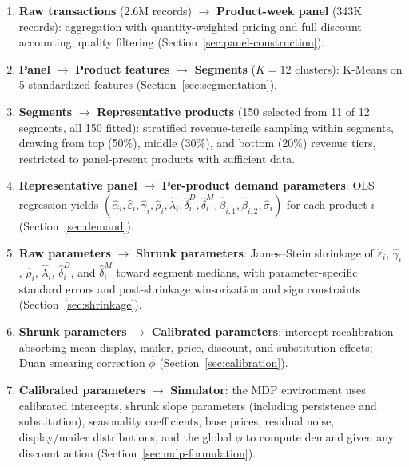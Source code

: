 \documentclass[12pt,a4paper]{article}
\begin{document}
\begin{enumerate}
\item \textbf{Raw transactions} (2.6M records) $\to$
\textbf{Product-week panel} (343K records): aggregation with
quantity-weighted pricing and full discount accounting,
quality filtering (Section~\ref{sec:panel-construction}).

\item \textbf{Panel} $\to$ \textbf{Product features} $\to$
\textbf{Segments} ($K=12$ clusters): K-Means on 5 standardized
features (Section~\ref{sec:segmentation}).

\item \textbf{Segments} $\to$ \textbf{Representative products}
(150 selected from 11 of 12 segments, all 150 fitted):
stratified revenue-tercile sampling within segments, drawing from
top (50\%), middle (30\%), and bottom (20\%) revenue tiers,
restricted to panel-present products with sufficient data.

\item \textbf{Representative panel} $\to$ \textbf{Per-product
demand parameters}: OLS regression yields
$(\hat{\alpha}_i, \hat{\varepsilon}_i, \hat{\gamma}_i,
\hat{\rho}_i, \hat{\lambda}_i,
\hat{\delta}_i^D, \hat{\delta}_i^M,
\hat{\beta}_{i,1}, \hat{\beta}_{i,2},
\hat{\sigma}_i)$ for each
product $i$ (Section~\ref{sec:demand}).

\item \textbf{Raw parameters} $\to$ \textbf{Shrunk parameters}:
James--Stein shrinkage of $\hat{\varepsilon}_i$, $\hat{\gamma}_i$,
$\hat{\rho}_i$, $\hat{\lambda}_i$,
$\hat{\delta}_i^D$, and $\hat{\delta}_i^M$
toward segment medians, with parameter-specific standard errors
and post-shrinkage winsorization and sign constraints
(Section~\ref{sec:shrinkage}).

\item \textbf{Shrunk parameters} $\to$ \textbf{Calibrated parameters}:
intercept recalibration absorbing mean display, mailer, price,
discount, and substitution effects; Duan smearing
correction $\hat{\phi}$ (Section~\ref{sec:calibration}).

\item \textbf{Calibrated parameters} $\to$ \textbf{Simulator}: the
MDP environment uses calibrated intercepts, shrunk slope parameters
(including persistence and substitution), seasonality coefficients,
base prices, residual noise, display/mailer
distributions, and the global $\hat{\phi}$ to compute demand given
any discount action (Section~\ref{sec:mdp-formulation}).
\end{enumerate}
\end{document}
